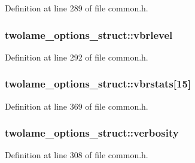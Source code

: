 Definition at line 289 of file common.\+h.

\subsubsection[{\texorpdfstring{vbrlevel}{vbrlevel}}]{ twolame\+\_\+options\+\_\+struct\+::vbrlevel}\hypertarget{structtwolame__options__struct_a09d6b0d1f00cfc6bc928984ae15b3b4c}{}\label{structtwolame__options__struct_a09d6b0d1f00cfc6bc928984ae15b3b4c}


Definition at line 292 of file common.\+h.

\subsubsection[{\texorpdfstring{vbrstats}{vbrstats}}]{ twolame\+\_\+options\+\_\+struct\+::vbrstats\mbox{[}15\mbox{]}}\hypertarget{structtwolame__options__struct_a814a435587623bfa5430c511c80ce753}{}\label{structtwolame__options__struct_a814a435587623bfa5430c511c80ce753}


Definition at line 369 of file common.\+h.

\subsubsection[{\texorpdfstring{verbosity}{verbosity}}]{ twolame\+\_\+options\+\_\+struct\+::verbosity}\hypertarget{structtwolame__options__struct_a85004829f276bc6adf993ff2cb3f3fd2}{}\label{structtwolame__options__struct_a85004829f276bc6adf993ff2cb3f3fd2}


Definition at line 308 of file common.\+h.

